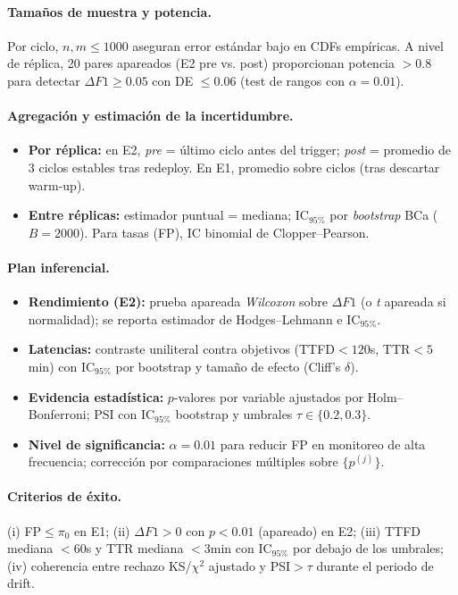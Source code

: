 \paragraph{Tamaños de muestra y potencia.}
Por ciclo, $n,m\le 1000$ aseguran error estándar bajo en CDFs empíricas.
A nivel de réplica, 20 pares apareados (E2 pre vs. post) proporcionan potencia $>0.8$ para detectar $\Delta F1\ge 0.05$ con DE $\le 0.06$ (test de rangos con $\alpha=0.01$).

\paragraph{Agregación y estimación de la incertidumbre.}
\begin{itemize}\setlength\itemsep{2pt}
  \item \textbf{Por réplica:} en E2, \emph{pre} = último ciclo antes del trigger; \emph{post} = promedio de 3 ciclos estables tras redeploy. En E1, promedio sobre ciclos (tras descartar warm-up).
  \item \textbf{Entre réplicas:} estimador puntual = mediana; IC$_{95\%}$ por \emph{bootstrap} BCa ($B{=}2000$). Para tasas (FP), IC binomial de Clopper–Pearson.
\end{itemize}

\paragraph{Plan inferencial.}
\begin{itemize}\setlength\itemsep{2pt}
  \item \textbf{Rendimiento (E2):} prueba apareada \emph{Wilcoxon} sobre $\Delta F1$ (o \emph{t} apareada si normalidad); se reporta estimador de Hodges–Lehmann e IC$_{95\%}$. 
  \item \textbf{Latencias:} contraste uniliteral contra objetivos (TTFD$<120$s, TTR$<5$min) con IC$_{95\%}$ por bootstrap y tamaño de efecto (Cliff’s $\delta$).
  \item \textbf{Evidencia estadística:} $p$-valores por variable ajustados por Holm–Bonferroni; PSI con IC$_{95\%}$ bootstrap y umbrales $\tau\in\{0.2,0.3\}$.
  \item \textbf{Nivel de significancia:} $\alpha=0.01$ para reducir FP en monitoreo de alta frecuencia; corrección por comparaciones múltiples sobre $\{p^{(j)}\}$.
\end{itemize}

\paragraph{Criterios de éxito.}
(i) FP$\le\pi_0$ en E1; (ii) $\Delta F1>0$ con $p<0.01$ (apareado) en E2; 
(iii) TTFD mediana $<60$s y TTR mediana $<3$min con IC$_{95\%}$ por debajo de los umbrales; 
(iv) coherencia entre rechazo KS/$\chi^2$ ajustado y PSI$>\tau$ durante el periodo de drift.


